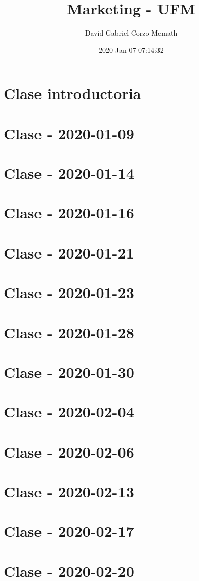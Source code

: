 \documentclass{book}
\title{Marketing - UFM}
\author{David Gabriel Corzo Mcmath}
\date{2020-Jan-07 07:14:32}
\begin{document}
\maketitle
\tableofcontents

\chapter{Clase introductoria}


\chapter{Clase - 2020-01-09}


\chapter{Clase - 2020-01-14}


\chapter{Clase - 2020-01-16}


\chapter{Clase - 2020-01-21}


\chapter{Clase - 2020-01-23}


\chapter{Clase - 2020-01-28}


\chapter{Clase - 2020-01-30}


\chapter{Clase - 2020-02-04}


\chapter{Clase - 2020-02-06}


\chapter{Clase - 2020-02-13}


\chapter{Clase - 2020-02-17}


\chapter{Clase - 2020-02-20}

\end{document}

